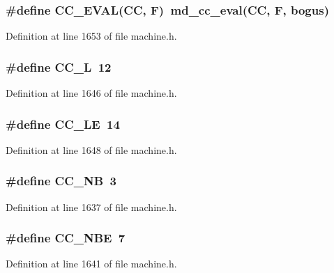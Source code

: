 \subsubsection[{CC\_\-EVAL}]{\setlength{\rightskip}{0pt plus 5cm}\#define CC\_\-EVAL(CC, \/  F)~md\_\-cc\_\-eval(CC, F, bogus)}\label{machine_8h_b8419b8877d2668126773984c7d5ce1b}




Definition at line 1653 of file machine.h.
\subsubsection[{CC\_\-L}]{\setlength{\rightskip}{0pt plus 5cm}\#define CC\_\-L~12}\label{machine_8h_4df548c78cf7fbc798f80195894998e5}




Definition at line 1646 of file machine.h.
\subsubsection[{CC\_\-LE}]{\setlength{\rightskip}{0pt plus 5cm}\#define CC\_\-LE~14}\label{machine_8h_c1bbb821dd183ff1284ed3ee014bcf54}




Definition at line 1648 of file machine.h.
\subsubsection[{CC\_\-NB}]{\setlength{\rightskip}{0pt plus 5cm}\#define CC\_\-NB~3}\label{machine_8h_f7410995051afd5bc19bacd295e5fe00}




Definition at line 1637 of file machine.h.
\subsubsection[{CC\_\-NBE}]{\setlength{\rightskip}{0pt plus 5cm}\#define CC\_\-NBE~7}\label{machine_8h_85254e36ed6b4e36df65cccdd4ea501a}




Definition at line 1641 of file machine.h.
